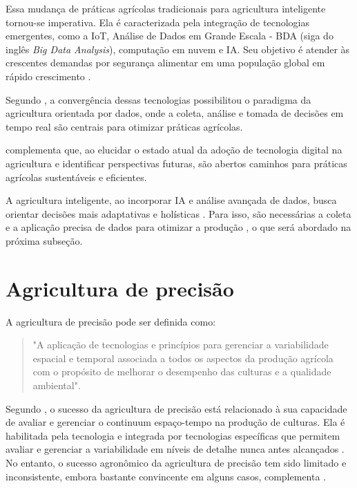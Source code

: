 Essa mudança de práticas agrícolas tradicionais para agricultura inteligente tornou-se imperativa. Ela é caracterizada pela integração de tecnologias emergentes, como a IoT, Análise de Dados em Grande Escala - BDA (siga do inglês \textit{Big Data Analysis}), computação em nuvem e IA. Seu objetivo é atender às crescentes demandas por segurança alimentar em uma população global em rápido crescimento \parencite{Gurjeet_smart2022, Garg_smart2023}.

Segundo \textcite{Garg_smart2023}, a convergência dessas tecnologias possibilitou o paradigma da agricultura orientada por dados, onde a coleta, análise e tomada de decisões em tempo real são centrais para otimizar práticas agrícolas.

\textcite{Gurjeet_smart2022} complementa que, ao elucidar o estado atual da adoção de tecnologia digital na agricultura e identificar perspectivas futuras, são abertos caminhos para práticas agrícolas sustentáveis e eficientes.

A agricultura inteligente, ao incorporar IA e análise avançada de dados, busca orientar decisões mais adaptativas e holísticas \parencite{Garg_smart2023}. Para isso, são necessárias a coleta e a aplicação precisa de dados para otimizar a produção \parencite{Lamine_precision2024}, o que será abordado na próxima subseção.

\section{Agricultura de precisão}

A agricultura de precisão pode ser definida como: 

\begin{quote}
  "A aplicação de tecnologias e princípios para gerenciar a variabilidade espacial e temporal associada a todos os aspectos da produção agrícola com o propósito de melhorar o desempenho das culturas e a qualidade ambiental". \parencite[{p. 1}]{Pierce_precision1999}
\end{quote}

Segundo \textcite{Pierce_precision1999}, o sucesso da agricultura de precisão está relacionado à sua capacidade de avaliar e gerenciar o continuum espaço-tempo na produção de culturas. Ela é habilitada pela tecnologia e integrada por tecnologias específicas que permitem avaliar e gerenciar a variabilidade em níveis de detalhe nunca antes alcançados \parencite{Zhang_precision2002}. No entanto, o sucesso agronômico da agricultura de precisão tem sido limitado e inconsistente, embora bastante convincente em alguns casos, complementa \textcite{Zhang_precision2002}.

